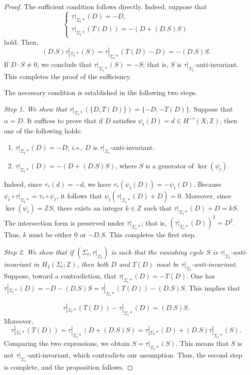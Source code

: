 \documentclass[10pt,a4paper]{article}
\numberwithin{equation}{section}
\theoremstyle{definition}
\theoremstyle{plain}
\theoremstyle{remark}
\newcommand{\Z}{\mathbb{Z}}
\begin{document}
\begin{proof}
The sufficient condition follows directly. Indeed, suppose that
$$\begin{cases}
\tau|_{\Sigma_t*}(D)=-D,\\
\tau|_{\Sigma_t*}(T(D))=-(D+(D.S)S)
\end{cases}$$
hold. Then, $$(D.S)\tau|_{\Sigma_t*}(S)=\tau|_{\Sigma_t*}(T(D)-D)=-(D.S)S.$$
If $D \cdot S \neq 0$, we conclude that $\tau|_{\Sigma_t*}(S) = -S$; that is, $S$ is $\tau|_{\Sigma_t}$-anti-invariant. This completes the proof of the sufficiency.

The necessary condition is established in the following two steps.

\textit{Step 1. We show that $\tau|_{\Sigma_t*}(\{D,T(D)\})=\{-D,-T(D)\}$.}
Suppose that $\alpha=D$. It suffices to prove that if $D$ satisfies $\psi_t(D)=d\in H^{-\tau}(X;\Z)$, then one of the following holds:
\begin{enumerate}
    \item $\tau|_{\Sigma_t*}(D)=-D$; \textit{i.e.}, $D$ is $\tau|_{\Sigma_t}$-anti-invariant.
    \item $\tau|_{\Sigma_t*}(D)=-(D+(D.S)S)$, where $S$ is a generator of $\ker(\psi_t)$.
\end{enumerate}
Indeed, since $\tau_* (d)=-d$, we have $\tau_*(\psi_t(D))=-\psi_t (D)$. Because $\psi_t\circ\tau|_{\Sigma_t*}=\tau_*\circ \psi_t$, it follows that $\psi_t (\tau|_{\Sigma_t*}(D)+D)=0$. Moreover, since $\ker (\psi_t) =\Z S$, there exists an integer $k\in \Z$ such that $\tau|_{\Sigma_t*}(D)+D=kS$. The intersection form is preserved under $\tau|_{\Sigma_t*}$; that is, $(\tau|_{\Sigma_t*}(D))^2=D^2$. Thus, $k$ must be either $0$ or $-D.S$. This completes the first step.


\textit{Step 2. We show that if $(\Sigma_t,\tau|_{\Sigma_t})$ is  such that the vanishing cycle $S$ is $\tau|_{\Sigma_t}$-anti-invariant in $H_2(\Sigma_t; \Z)$, then both $D$ and $T(D)$ must be $\tau|_{\Sigma_t}$-anti-invariant. } Suppose, toward a contradiction, that $\tau|_{\Sigma_t*}(D)=-T(D)$. One has $\tau|_{\Sigma_t*}(D)=-D-(D.S)S=\tau|_{\Sigma_t*}(T(D))-(D.S)S$. This implies that 

$$\tau|_{\Sigma_t*}(T(D))-\tau|_{\Sigma_t*}(D)=(D.S)S.$$
Moreover, $$\tau|_{\Sigma_t*}(T(D))=\tau|_{\Sigma_t*}(D+(D.S)S)=\tau|_{\Sigma_t*}(D)+(D.S) \tau|_{\Sigma_t*}(S).$$
Comparing the two expressions, we obtain $S=\tau|_{\Sigma_t*}(S)$. This means that $S$ is not $\tau|_{\Sigma_t}$-anti-invariant, which contradicts our assumption. Thus, the second step is complete, and the proposition follows.
\end{proof}
\end{document}
